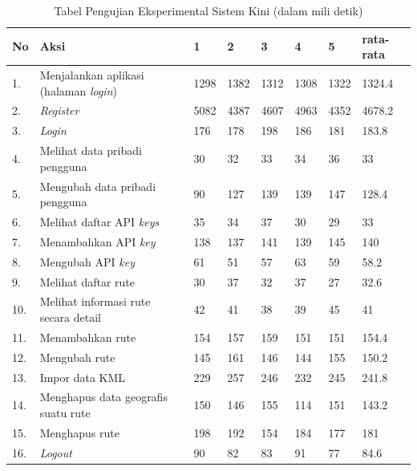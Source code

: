 \begin{table}[H]
	\centering
	\caption{Tabel Pengujian Eksperimental Sistem Kini (dalam mili detik)}
		\begin{tabular}{|p{0.37cm}| p{7cm}| p{1cm}| p{1cm}| p{1cm}| p{1cm}| p{1cm}| p{1cm}|} \hline
		No & Aksi & 1 & 2 & 3 & 4 & 5 & rata-rata \\ \hline
		1. & Menjalankan aplikasi (halaman \textit{login}) & 1298	&	1382	&	1312	&	1308	&	1322	&	1324.4 \\ \hline
 		2. & \textit{Register} & 5082	&	4387	&	4607	&	4963	&	4352	&	4678.2 \\ \hline
		3. & \textit{Login} & 176	&	178	&	198	&	186	&	181	&	183.8 \\ \hline
		4. & Melihat data pribadi pengguna & 30	&	32	&	33	&	34	&	36	&	33 \\ \hline
		5. & Mengubah data pribadi pengguna & 90	&	127	&	139	&	139	&	147	&	128.4 \\ \hline
		6. & Melihat daftar API \textit{keys} & 35	&	34	&	37	&	30	&	29	&	33 \\ \hline
		7. & Menambahkan API \textit{key} & 138	&	137	&	141	&	139	&	145	&	140 \\ \hline
		8. & Mengubah API \textit{key} & 61	&	51	&	57	&	63	&	59	&	58.2 \\ \hline
		9. & Melihat daftar rute & 30	&	37	&	32	&	37	&	27	&	32.6 \\ \hline
		10. & Melihat informasi rute secara detail & 42	&	41	&	38	&	39	&	45	&	41 \\ \hline
		11. & Menambahkan rute & 154	&	157	&	159	&	151	&	151	&	154.4 \\ \hline
		12. & Mengubah rute & 145	&	161	&	146	&	144	&	155	&	150.2 \\ \hline
		13. & Impor data KML & 229	&	257	&	246	&	232	&	245	&	241.8 \\ \hline
		14. & Menghapus data geografis suatu rute & 150	&	146	&	155	&	114	&	151	&	143.2 \\ \hline
		15. & Menghapus rute & 198	&	192	&	154	&	184	&	177	&	181 \\ \hline
		16. & \textit{Logout} & 90	&	82	&	83	&	91	&	77	&	84.6 \\ \hline
		\end{tabular}
	\label{table:hasileksperimental1}
\end{table}

